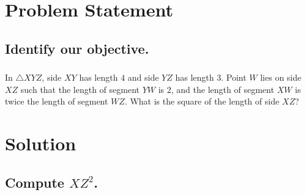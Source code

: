 \documentclass{beamer} %
\begin{document}
\begin{frame} %
  \titlepage
\end{frame}


\section{Problem Statement}

\subsection*{Identify our objective.}

\begin{frame}
  \frametitle{}
  In $\triangle XYZ$, side $XY$ has length $4$ and side $YZ$ has length $3$. Point $W$ lies on side $XZ$ such that the length of segment $YW$ is $2$, and the length of segment $XW$ is twice the length of segment $WZ$. What is the square of the length of side $XZ$?
  \begin{center}
  \end{center}
\end{frame}

\section{Solution}

\subsection*{Compute $XZ^2$.}
\end{document}
